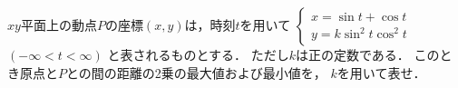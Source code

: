 \documentclass[../../main.tex]{subfiles}
\begin{document}
$xy$平面上の動点$P$の座標$(x,y)$は，時刻$t$を用いて
$
\begin{cases}
  x= \sin t+\cos t \\
  y = k \sin^2 t \cos^2 t
\end{cases}$
$(-\infty <t< \infty)$
と表されるものとする．
ただし$k$は正の定数である．
このとき原点と$P$との間の距離の2乗の最大値および最小値を，
$k$を用いて表せ．
\end{document}
